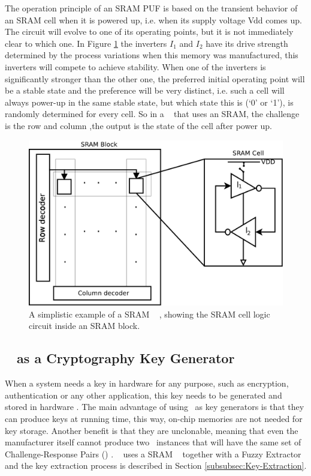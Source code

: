 The operation principle of an SRAM PUF is based on the transient behavior of an SRAM cell when it is powered up, i.e. when its supply voltage Vdd comes up. The circuit will evolve to one of its operating points, but it is not immediately clear to which one. In Figure   \ref{fig:spufexample} the inverters $I_1$ and $I_2$ have its drive strength determined by the process variations when this memory was manufactured, this inverters will compete to achieve stability. When one of the inverters is significantly stronger than the other one, the preferred initial operating point will be a stable state and the preference will be very distinct, i.e. such a cell will always power-up in the same stable state, but which state this is (‘0’ or ‘1’), is randomly determined for every cell.
So in a \puf~ that uses an SRAM, the challenge is the row and column ,the output is the state of the cell after power up.
\begin{figure}[!ht]
	\centering
	\includegraphics[scale=0.55]{figures/pdf/spuf}
	\caption{A simplistic example of a SRAM \puf~ , showing the SRAM cell logic circuit inside an SRAM block.}
	\label{fig:spufexample}
\end{figure}


\subsection{\puf~ as a Cryptography  Key Generator }
When a system needs a key in hardware for any purpose, such as encryption, authentication or any other application, this key needs to be generated  and stored in hardware \cite{puf-key-devadas-1278484}. The main advantage of using \pufs~as key generators is that they can produce keys at running time, this way, on-chip memories are not needed for key storage. Another benefit is that they are unclonable, meaning that even the manufacturer itself cannot produce two \puf~instances that will have the same set of Challenge-Response Pairs (\crps) \cite{Gassend2002:PUFs}.
\cshia~ uses a SRAM \puf~ together with a Fuzzy Extractor and the key extraction process is described in Section \ref{subsubsec:Key-Extraction}.


